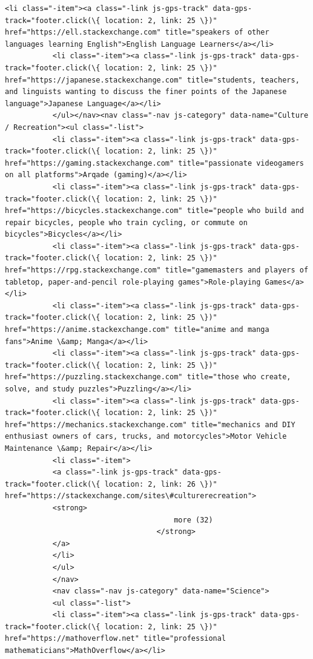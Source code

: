 \documentclass[11pt]{article}
\begin{document}
\begin{Verbatim}[commandchars=\\\{\}]
           <li class="-item"><a class="-link js-gps-track" data-gps-track="footer.click(\{ location: 2, link: 25 \})" href="https://ell.stackexchange.com" title="speakers of other languages learning English">English Language Learners</a></li>
           <li class="-item"><a class="-link js-gps-track" data-gps-track="footer.click(\{ location: 2, link: 25 \})" href="https://japanese.stackexchange.com" title="students, teachers, and linguists wanting to discuss the finer points of the Japanese language">Japanese Language</a></li>
           </ul></nav><nav class="-nav js-category" data-name="Culture / Recreation"><ul class="-list">
           <li class="-item"><a class="-link js-gps-track" data-gps-track="footer.click(\{ location: 2, link: 25 \})" href="https://gaming.stackexchange.com" title="passionate videogamers on all platforms">Arqade (gaming)</a></li>
           <li class="-item"><a class="-link js-gps-track" data-gps-track="footer.click(\{ location: 2, link: 25 \})" href="https://bicycles.stackexchange.com" title="people who build and repair bicycles, people who train cycling, or commute on bicycles">Bicycles</a></li>
           <li class="-item"><a class="-link js-gps-track" data-gps-track="footer.click(\{ location: 2, link: 25 \})" href="https://rpg.stackexchange.com" title="gamemasters and players of tabletop, paper-and-pencil role-playing games">Role-playing Games</a></li>
           <li class="-item"><a class="-link js-gps-track" data-gps-track="footer.click(\{ location: 2, link: 25 \})" href="https://anime.stackexchange.com" title="anime and manga fans">Anime \&amp; Manga</a></li>
           <li class="-item"><a class="-link js-gps-track" data-gps-track="footer.click(\{ location: 2, link: 25 \})" href="https://puzzling.stackexchange.com" title="those who create, solve, and study puzzles">Puzzling</a></li>
           <li class="-item"><a class="-link js-gps-track" data-gps-track="footer.click(\{ location: 2, link: 25 \})" href="https://mechanics.stackexchange.com" title="mechanics and DIY enthusiast owners of cars, trucks, and motorcycles">Motor Vehicle Maintenance \&amp; Repair</a></li>
           <li class="-item">
           <a class="-link js-gps-track" data-gps-track="footer.click(\{ location: 2, link: 26 \})" href="https://stackexchange.com/sites\#culturerecreation">
           <strong>
                                       more (32)
                                   </strong>
           </a>
           </li>
           </ul>
           </nav>
           <nav class="-nav js-category" data-name="Science">
           <ul class="-list">
           <li class="-item"><a class="-link js-gps-track" data-gps-track="footer.click(\{ location: 2, link: 25 \})" href="https://mathoverflow.net" title="professional mathematicians">MathOverflow</a></li>

\end{Verbatim}
\end{document}
